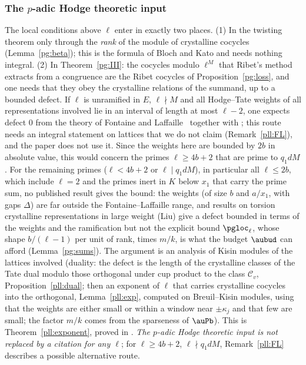 \documentclass[10pt]{amsart}
\theoremstyle{definition}
\theoremstyle{remark}
\begin{document}
\subsubsection*{The $p$-adic Hodge theoretic input}
The local conditions above $\ell$ enter in exactly two places. (1) In the twisting theorem only
through the \emph{rank} of the module of crystalline cocycles (Lemma~\ref{pg:beta}); this is the
formula of Bloch and Kato and needs nothing integral. (2) In Theorem~\ref{pg:III}: the cocycles
modulo $\ell^M$ that Ribet's method extracts from a congruence are the Ribet cocycles of
Proposition~\ref{pg:loss}, and one needs that they obey the crystalline relations of the
summand, up to a bounded defect. If $\ell$ is unramified in $E$, $\ell\nmid M$ and all Hodge--Tate
weights of all representations involved lie in an interval of length at most $\ell-2$, one
expects defect $0$ from the theory of Fontaine and Laffaille~\cite{FontaineLaffaille} together with
\cite[Lemmas~4.4--4.5]{BlochKato}; this route needs an integral statement on lattices that we do
not claim (Remark~\ref{pll:FL}), and the paper does not use it. Since the weights here are bounded by $2b$ in absolute value, this would concern
the primes $\ell\ge4b+2$ that are prime to $q_1dM$. For the remaining primes ($\ell<4b+2$ or $\ell\mid q_1dM$), in particular all $\ell\le2b$, which include $\ell=2$ and the primes inert in $K$ below $x_1$ that carry the prime
sum, no published result gives the bound: the weights (of size $b$ and $a/x_1$, with gaps
$\Delta$) are far outside the Fontaine--Laffaille range, and results on torsion crystalline
representations in large weight (Liu) give a defect bounded in terms of the weights and the
ramification but not the explicit bound $\pgloc_\ell$, whose shape $b/(\ell-1)$ per unit of rank,
times $m/k$, is what the budget $\aubud$ can afford (Lemma~\ref{pg:sums}). The argument is an
analysis of Kisin modules of the lattices involved (duality: the defect is the length of the
crystalline classes of the Tate dual modulo those orthogonal under cup product to the class
$\mathcal C_v$, Proposition~\ref{pll:dual}; then an exponent of $\ell$ that carries crystalline
cocycles into the orthogonal, Lemma~\ref{pll:exp}, computed on Breuil--Kisin modules, using that the
weights are either small or within a window near $\pm\kappa_j$ and that few are small; the factor
$m/k$ comes from the sparseness of $\auPb$). This is Theorem~\ref{pll:exponent}, proved in
{\cite[\S2.3]{P56}}. \emph{The $p$-adic Hodge theoretic input is not replaced by a citation for any $\ell$}; for
$\ell\ge4b+2$, $\ell\nmid q_1dM$, Remark~\ref{pll:FL} describes a possible alternative route.
\end{document}
